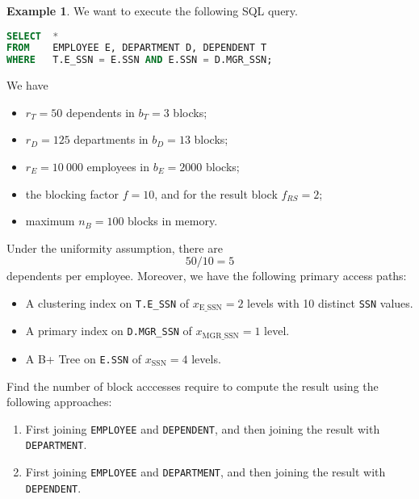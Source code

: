\documentclass[a4paper, openany]{memoir}
\theoremstyle{definition}
\newtheorem{example}[subsection]{Example}
\begin{document}
\begin{example}
We want to execute the following SQL query.
    \begin{lstlisting}[language=SQL]
SELECT  *
FROM    EMPLOYEE E, DEPARTMENT D, DEPENDENT T
WHERE   T.E_SSN = E.SSN AND E.SSN = D.MGR_SSN;
\end{lstlisting}
    We have
    \begin{itemize}
        \item $r_T = 50$ dependents in $b_T = 3$ blocks;
        \item $r_D = 125$ departments in $b_D = 13$ blocks;
        \item $r_E = 10 \ 000$ employees in $b_E = 2000$ blocks;
        \item the blocking factor $f = 10$, and for the result block $f_{RS} = 2$;
        \item maximum $n_B = 100$ blocks in memory.
    \end{itemize}
    Under the uniformity assumption, there are
    \[50/10 = 5\]
    dependents per employee. Moreover, we have the following primary access paths:
    \begin{itemize}
        \item A clustering index on \texttt{T.E\_SSN} of $x_{\text{E\_SSN}} = 2$ levels with 10 distinct \texttt{SSN} values.
        \item A primary index on \texttt{D.MGR\_SSN} of $x_{\text{MGR\_SSN}} = 1$ level.
        \item A B+ Tree on \texttt{E.SSN} of $x_{\text{SSN}} = 4$ levels.
    \end{itemize}

    Find the number of block acccesses require to compute the result using the following approaches:
    \begin{enumerate}
        \item First joining \texttt{EMPLOYEE} and \texttt{DEPENDENT}, and then joining the result with \texttt{DEPARTMENT}.
        \item First joining \texttt{EMPLOYEE} and \texttt{DEPARTMENT}, and then joining the result with \texttt{DEPENDENT}.
    \end{enumerate}
\end{example}
\end{document}
